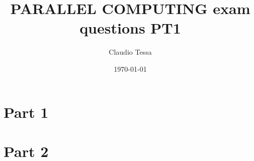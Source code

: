 \documentclass[12pt]{article}
\title{PARALLEL COMPUTING exam questions PT1}
\author{Claudio Tessa}
\date{\today}
\theoremstyle{spaced}
\theoremstyle{spaced}
\begin{document}
\maketitle

\tableofcontents
\newpage

\section{Part 1}





\section{Part 2}




\end{document}
